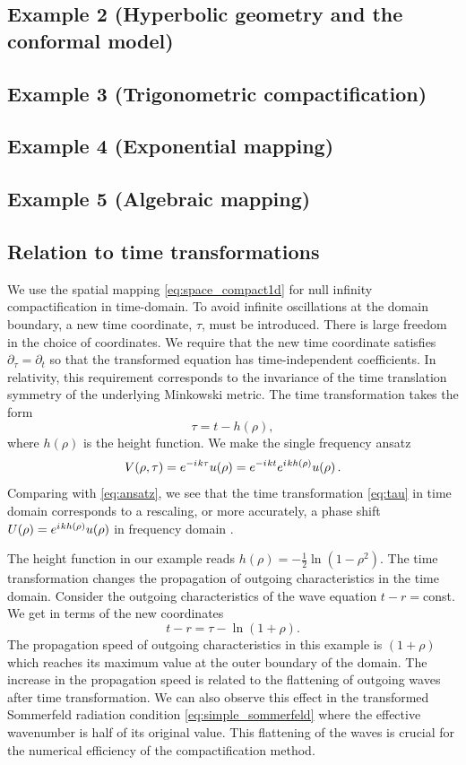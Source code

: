 \documentclass[final,onefignum,onetabnum]{siamart190516}
\newcommand{\be}{\begin{equation}}
\newcommand{\ee}{\end{equation}}
\newcommand{\iu}{{i\mkern1mu}}
\begin{document}
\subsection{Example 2 (Hyperbolic geometry and the conformal model)}

\subsection{Example 3 (Trigonometric compactification)}

\subsection{Example 4 (Exponential mapping)}

\subsection{Example 5 (Algebraic mapping)}

\subsection{Relation to time transformations}\label{sec:time}

We use the spatial mapping \eqref{eq:space_compact1d} for null infinity compactification in time-domain. To avoid infinite oscillations at the domain boundary, a new time coordinate, $\tau$, must be introduced. There is large freedom in the choice of coordinates. We require that the new time coordinate satisfies $\partial_\tau=\partial_t$ so that the transformed equation has time-independent coefficients. In relativity, this requirement corresponds to the invariance of the time translation symmetry of the underlying Minkowski metric. The time transformation takes the form
\be\label{eq:tau} \tau = t - h(\rho),\ee
where $h(\rho)$ is the height function. We make the single frequency ansatz
\[ V(\rho, \tau) = e^{-\iu k \tau} u(\rho) = e^{-\iu k t} e^{\iu k h(\rho)} u(\rho)\,.\]
Comparing with \eqref{eq:ansatz}, we see that the time transformation \eqref{eq:tau} in time domain corresponds to a rescaling, or more accurately, a phase shift $U(\rho) = e^{\iu k h(\rho)} u(\rho)$ in frequency domain \cite{ZengFramework, marchner2021stable}.

The height function in our example reads $h(\rho)=-\tfrac{1}{2}\ln(1-\rho^2)$. The time transformation changes the propagation of outgoing characteristics in the time domain. Consider the outgoing characteristics of the wave equation $t-r=$const. We get in terms of the new coordinates
\be\label{eq:time_chars} t - r = \tau - \ln(1+\rho).\ee
The propagation speed of outgoing characteristics in this example is $(1+\rho)$ which reaches its maximum value at the outer boundary of the domain. The increase in the propagation speed is related to the flattening of outgoing waves after time transformation. We can also observe this effect in the transformed Sommerfeld radiation condition \eqref{eq:simple_sommerfeld} where the effective wavenumber is half of its original value. This flattening of the waves is crucial for the numerical efficiency of the compactification method.
\end{document}
